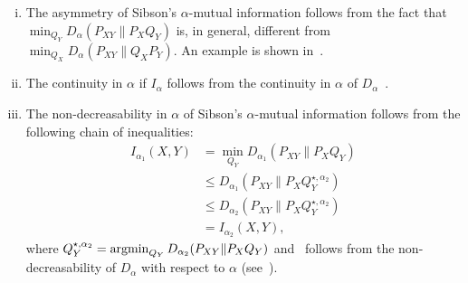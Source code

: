 \documentclass{article}
\numberwithin{theorem}{section}
\numberwithin{example}{section}
\numberwithin{remark}{section}
\numberwithin{definition}{section}
\newcommand{\argmin}{\operatornamewithlimits{argmin}}
\begin{document}
\begin{enumerate}[i)]    \item  The asymmetry of Sibson's $\alpha$-mutual information follows from the fact that $\min_{Q_Y} D_\alpha(P_{XY}\|P_XQ_Y)$ is, in general, different from $\min_{Q_X}D_\alpha(P_{XY}\|Q_XP_Y)$. An example is shown in~.
    \item The continuity in $\alpha$ if $I_\alpha$ follows from the continuity in $\alpha$ of $D_\alpha$~\cite[Theorem 7]{renyiDiv}.
    \item The non-decreasability in $\alpha$ of Sibson's $\alpha$-mutual information follows from the following chain of inequalities:
    \begin{align}
        I_{\alpha_1}(X,Y) &= \min_{Q_Y} D_{\alpha_1}(P_{XY}\|P_XQ_Y) \\
        &\leq D_{\alpha_1}(P_{XY}\|P_XQ^{\star,\alpha_2}_Y) \\
        &\leq D_{\alpha_2}(P_{XY}\|P_XQ^{\star,\alpha_2}_Y) \label{eq:nonDecr} \\
        &= I_{\alpha_2}(X,Y),
    \end{align}
    where $Q_Y^{\star,\alpha_2}=\argmin_{Q_Y}D_{\alpha_2}(P_{XY}\|P_XQ_Y)$ and~ follows from the non-decreasability of $D_\alpha$ with respect to $\alpha$ (see~\cite[Theorem 3]{renyiDiv}).
\end{enumerate}
\end{document}
